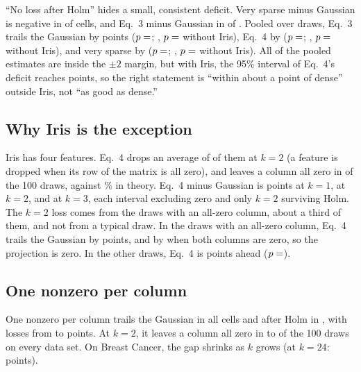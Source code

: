 ``No loss after Holm'' hides a small, consistent deficit. Very sparse minus Gaussian is negative in  of  cells, and Eq.~3 minus Gaussian in  of . Pooled over draws, Eq.~3 trails the Gaussian by  points ($p = \N{pool:eq3:gauss:p}$; , $p = \N{pool:eq3:gauss:noiris:p}$ without Iris), Eq.~4 by  ($p = \N{pool:eq4:gauss:p}$; , $p = \N{pool:eq4:gauss:noiris:p}$ without Iris), and very sparse by  ($p = \N{pool:vs:gauss:p}$; , $p = \N{pool:vs:gauss:noiris:p}$ without Iris). All of the pooled estimates are inside the $\pm 2$ margin, but with Iris, the 95\% interval of Eq.~4's deficit reaches  points, so the right statement is ``within about a point of dense'' outside Iris, not ``as good as dense.''

\subsection{Why Iris is the exception}

Iris has four features. Eq.~4 drops an average of  of them at $k = 2$ (a feature is dropped when its row of the matrix is all zero), and leaves a column all zero in  of the 100 draws, against \% in theory. Eq.~4 minus Gaussian is  points at $k = 1$,  at $k = 2$, and  at $k = 3$, each interval excluding zero and only $k = 2$ surviving Holm. The $k = 2$ loss comes from the draws with an all-zero column, about a third of them, and not from a typical draw. In the  draws with an all-zero column, Eq.~4 trails the Gaussian by  points, and by  when both columns are zero, so the projection is zero. In the other  draws, Eq.~4 is  points ahead ($p = \N{z:iris_k2_full_p}$).

\subsection{One nonzero per column}

One nonzero per column trails the Gaussian in all  cells and after Holm in , with losses from  to  points. At $k = 2$, it leaves a column all zero in  to  of the 100 draws on every data set. On Breast Cancer, the gap shrinks as $k$ grows (at $k = 24$:  points).

